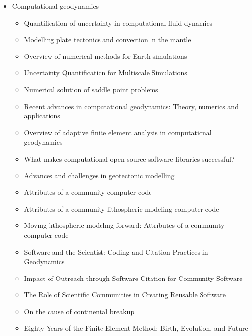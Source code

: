 \begin{itemize}
\item Computational geodynamics
   \begin{itemize}
   \item [\nineteenninetyseven] Quantification of uncertainty in computational fluid dynamics \cite{roac97}
   \item [\twothousand] Modelling plate tectonics and convection in the mantle \cite{mogz00}
   \item [\twothousandone] Overview of numerical methods for Earth simulations \cite{momd01}
   \item [\twothousandtwo] Uncertainty Quantification for Multiscale Simulations \cite{degg02}
   \item [\twothousandfive] Numerical solution of saddle point problems \cite{begl05}
   \item [\twothousandeight] Recent advances in computational geodynamics: Theory, numerics and applications \cite{kags08}
   \item [\twothousandthirteen] Overview of adaptive finite element analysis in computational geodynamics \cite{masm13}
   \item [\twothousandthirteen] What makes computational open source software libraries successful? \cite{bahe13}
   \item [\twothousandfourteen] Advances and challenges in geotectonic modelling \cite{bufy14}
   \item [\twothousandfifteen] Attributes of a community computer code \cite{comc15}
   \item [\twothousandfifteen] Attributes of a community lithospheric modeling computer code \cite{comc15}
   \item [\twothousandfifteen] Moving lithospheric modeling forward: Attributes of a community computer code \cite{comc15}
   \item [\twothousandseventeen] Software and the Scientist: Coding and Citation Practices in Geodynamics \cite{hwfs17}
   \item [\twothousandnineteen] Impact of Outreach through Software Citation for Community Software \cite{hwpc19}
   \item [\twothousandnineteen] The Role of Scientific Communities in Creating Reusable Software \cite{kehg19}
   \item [\twothousandtwenty] On the cause of continental breakup \cite{niu20}
   \item [\twothousandtwentytwo] Eighty Years of the Finite Element Method: Birth, Evolution, and Future \cite{lilp22}
   \end{itemize}


\end{itemize}
